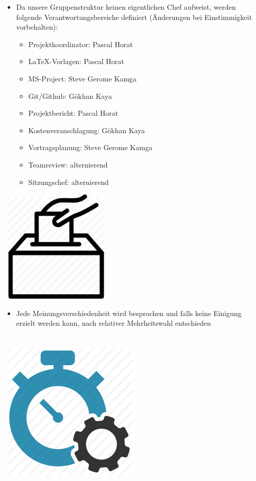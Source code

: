 \begin{itemize}
\item Da unsere Gruppenstruktur keinen eigentlichen Chef aufweist, werden folgende Verantwortungsbereiche definiert (Änderungen bei Einstimmigkeit vorbehalten):\\


\begin{itemize}
\item Projektkoordinator: Pascal Horat
\item LaTeX-Vorlagen: Pascal Horat
\item MS-Project: Steve Gerome Kamga
\item Git/Github: Gökhan Kaya  
\item Projektbericht: Pascal Horat
\item Kostenveranschlagung: Gökhan Kaya
\item Vortragsplanung: Steve Gerome Kamga
\item Teamreview: alternierend
\item Sitzungschef: alternierend
\end{itemize}
\end{itemize}


\begin{center}
\includegraphics[scale=0.3]{img/voteHand}\\
\end{center}

\begin{itemize}
\item Jede Meinungsverschiedenheit wird besprochen und falls keine Einigung erzielt werden kann, nach relativer Mehrheitswahl entschieden\\\\
\end{itemize}

\begin{center}
\includegraphics[scale=0.3]{img/performance}\\
\end{center}

